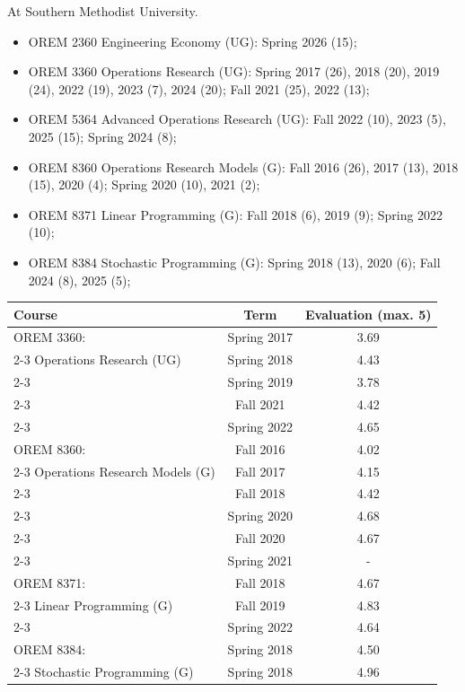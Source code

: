 \documentclass[hyperref, margin]{myResume}
\newif\ifpublic
\begin{document}
\begin{resume}
	At Southern Methodist University.
	\ifpublic
	\begin{itemize}
		\item OREM 2360 Engineering Economy (UG): Spring 2026 (15);
		\item OREM 3360 Operations Research (UG): Spring 2017 (26), 2018 (20), 2019 (24), 2022 (19), 2023 (7), 2024 (20); Fall 2021 (25), 2022 (13);
		\item OREM 5364 Advanced Operations Research (UG): Fall 2022 (10), 2023 (5), 2025 (15); Spring 2024 (8);
		\item OREM 8360 Operations Research Models (G): Fall 2016 (26), 2017 (13), 2018 (15), 2020 (4); Spring 2020 (10), 2021 (2);
		\item OREM 8371 Linear Programming (G): Fall 2018 (6), 2019 (9); Spring 2022 (10);
		\item OREM 8384 Stochastic Programming (G): Spring 2018 (13), 2020 (6); Fall 2024 (8), 2025 (5);
	\end{itemize}
	\else 	
	\begin{center}
		\renewcommand{\arraystretch}{1.3}
		\centering \begin{tabular}{|p{}|c|c|}
		\hline 
		Course & Term & Evaluation (max. 5) 	\\ \hline
		OREM 3360: 									& Spring 2017 	& 3.69 \\ \cline{2-3}
		Operations Research (UG)					& Spring 2018 	& 4.43 \\ \cline{2-3}
													& Spring 2019 	& 3.78 \\ \cline{2-3} 
													& Fall 2021		& 4.42 \\ \cline{2-3}
													& Spring 2022	& 4.65 \\ \hline
		OREM 8360: 									& Fall 2016 	& 4.02 \\ \cline{2-3}
		Operations Research Models (G)				& Fall 2017 	& 4.15 \\ \cline{2-3}
													& Fall 2018 	& 4.42 \\ \cline{2-3}
													& Spring 2020 	& 4.68 \\ \cline{2-3}
													& Fall 2020 	& 4.67 \\ \cline{2-3}
													& Spring 2021 	& - \\ \hline
		OREM 8371: 									& Fall 2018 	& 4.67 \\ \cline{2-3}
		Linear Programming (G)						& Fall 2019 	& 4.83 \\ \cline{2-3}
													& Spring 2022 	& 4.64 \\ \hline
		OREM 8384:									& Spring 2018 	& 4.50 \\ \cline{2-3}
		Stochastic Programming (G)					& Spring 2018 	& 4.96 \\ \hline
		\end{tabular}
	\end{center}
	

\end{resume}
\end{document}
